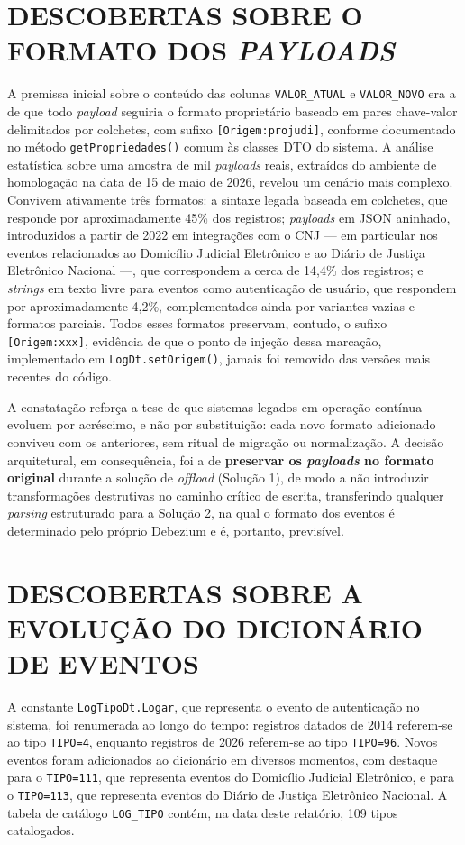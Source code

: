 \documentclass[12pt,letterpaper,oneside]{report}
\begin{document}
\section{DESCOBERTAS SOBRE O FORMATO DOS \textit{PAYLOADS}}

A premissa inicial sobre o conteúdo das colunas \texttt{VALOR\_ATUAL} e \texttt{VALOR\_NOVO} era a de que todo \textit{payload} seguiria o formato proprietário baseado em pares chave-valor delimitados por colchetes, com sufixo \texttt{[Origem:projudi]}, conforme documentado no método \texttt{getPropriedades()} comum às classes DTO do sistema. A análise estatística sobre uma amostra de mil \textit{payloads} reais, extraídos do ambiente de homologação na data de 15 de maio de 2026, revelou um cenário mais complexo. Convivem ativamente três formatos: a sintaxe legada baseada em colchetes, que responde por aproximadamente 45\% dos registros; \textit{payloads} em JSON aninhado, introduzidos a partir de 2022 em integrações com o CNJ — em particular nos eventos relacionados ao Domicílio Judicial Eletrônico e ao Diário de Justiça Eletrônico Nacional —, que correspondem a cerca de 14,4\% dos registros; e \textit{strings} em texto livre para eventos como autenticação de usuário, que respondem por aproximadamente 4,2\%, complementados ainda por variantes vazias e formatos parciais. Todos esses formatos preservam, contudo, o sufixo \texttt{[Origem:xxx]}, evidência de que o ponto de injeção dessa marcação, implementado em \texttt{LogDt.setOrigem()}, jamais foi removido das versões mais recentes do código.

A constatação reforça a tese de que sistemas legados em operação contínua evoluem por acréscimo, e não por substituição: cada novo formato adicionado conviveu com os anteriores, sem ritual de migração ou normalização. A decisão arquitetural, em consequência, foi a de \textbf{preservar os \textit{payloads} no formato original} durante a solução de \textit{offload} (Solução 1), de modo a não introduzir transformações destrutivas no caminho crítico de escrita, transferindo qualquer \textit{parsing} estruturado para a Solução 2, na qual o formato dos eventos é determinado pelo próprio Debezium e é, portanto, previsível.

\section{DESCOBERTAS SOBRE A EVOLUÇÃO DO DICIONÁRIO DE EVENTOS}

A constante \texttt{LogTipoDt.Logar}, que representa o evento de autenticação no sistema, foi renumerada ao longo do tempo: registros datados de 2014 referem-se ao tipo \texttt{TIPO=4}, enquanto registros de 2026 referem-se ao tipo \texttt{TIPO=96}. Novos eventos foram adicionados ao dicionário em diversos momentos, com destaque para o \texttt{TIPO=111}, que representa eventos do Domicílio Judicial Eletrônico, e para o \texttt{TIPO=113}, que representa eventos do Diário de Justiça Eletrônico Nacional. A tabela de catálogo \texttt{LOG\_TIPO} contém, na data deste relatório, 109 tipos catalogados.
\end{document}

